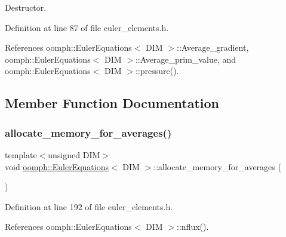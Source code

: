 Destructor. 



Definition at line 87 of file euler\+\_\+elements.\+h.



References oomph\+::\+Euler\+Equations$<$ D\+I\+M $>$\+::\+Average\+\_\+gradient, oomph\+::\+Euler\+Equations$<$ D\+I\+M $>$\+::\+Average\+\_\+prim\+\_\+value, and oomph\+::\+Euler\+Equations$<$ D\+I\+M $>$\+::pressure().



\subsection{Member Function Documentation}
\mbox{\label{classoomph_1_1EulerEquations_aee507c1b94ee9a6bdfd77db410ca85e8}} 
\subsubsection{\texorpdfstring{allocate\+\_\+memory\+\_\+for\+\_\+averages()}{allocate\_memory\_for\_averages()}}
{\footnotesize\ttfamily template$<$unsigned D\+IM$>$ \\
void \hyperlink{classoomph_1_1EulerEquations}{oomph\+::\+Euler\+Equations}$<$ D\+IM $>$\+::allocate\+\_\+memory\+\_\+for\+\_\+averages (\begin{DoxyParamCaption}{ }\end{DoxyParamCaption})\hspace{0.3cm}{\ttfamily [inline]}}



Definition at line 192 of file euler\+\_\+elements.\+h.



References oomph\+::\+Euler\+Equations$<$ D\+I\+M $>$\+::nflux().

\mbox{\label{classoomph_1_1EulerEquations_a0e83b231a00250adc6da3069b9936cc1}} 
